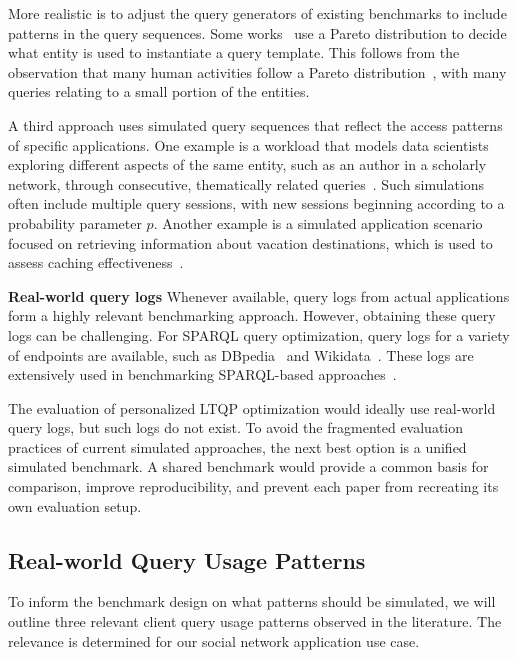More realistic is to adjust the query generators of existing benchmarks to include patterns in the query sequences.
Some works~\cite{williams2011enabling,martin2010improving} use a Pareto distribution to decide what entity is used to
instantiate a query template.
This follows from the observation that many human activities follow a Pareto distribution~\cite{arnold2014pareto},
 with many queries relating to a small portion of the entities.

A third approach uses simulated query sequences that reflect the access patterns of specific applications.
One example is a workload that models data scientists exploring different aspects of the same entity,
such as an author in a scholarly network, through consecutive, thematically related queries~\cite{chatzopoulos2022atrapos}.
Such simulations often include multiple query sessions, with new sessions beginning according to a probability parameter $p$.
Another example is a simulated application scenario focused on retrieving information about vacation destinations, 
which is used to assess caching effectiveness~\cite{martin2010improving}.

\textbf{Real-world query logs} Whenever available, query logs from actual applications form a highly relevant benchmarking approach.
However, obtaining these query logs can be challenging.
For SPARQL query optimization, query logs for a variety of endpoints are available, such as DBpedia~\cite{saleem2015lsq,stadler2024lsq,berendt2013usewod2013} and Wikidata~\cite{stadler2024lsq}.
These logs are extensively used in benchmarking SPARQL-based approaches~\cite{zhang2016secf,papailiou2015graph,lorey2013caching}.

The evaluation of personalized LTQP optimization would ideally use real-world query logs, but such logs do not exist.
To avoid the fragmented evaluation practices of current simulated approaches, the next best option is a unified simulated benchmark. 
A shared benchmark would provide a common basis for comparison, improve reproducibility, and prevent each paper from recreating its own evaluation setup.

\subsection{Real-world Query Usage Patterns}
\label{sec:related_work_qup}
To inform the benchmark design on what patterns should be simulated, we will outline three relevant client query usage patterns observed in the literature. The relevance is determined for our social network application use case.

